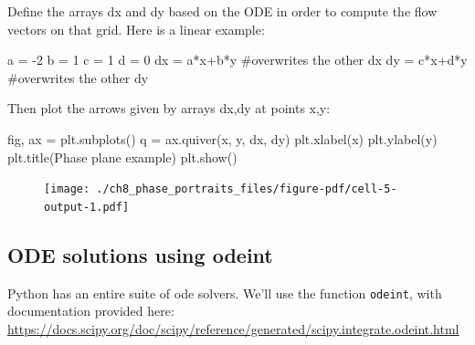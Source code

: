 \documentclass[
  letterpaper,
  DIV=11,
  numbers=noendperiod]{scrreprt}
\newenvironment{Shaded}{\begin{snugshade}}{\end{snugshade}}
\newcommand{\CommentTok}[1]{\textcolor[rgb]{0.37,0.37,0.37}{#1}}
\newcommand{\DecValTok}[1]{\textcolor[rgb]{0.68,0.00,0.00}{#1}}
\newcommand{\NormalTok}[1]{\textcolor[rgb]{0.00,0.23,0.31}{#1}}
\newcommand{\OperatorTok}[1]{\textcolor[rgb]{0.37,0.37,0.37}{#1}}
\newcommand{\StringTok}[1]{\textcolor[rgb]{0.13,0.47,0.30}{#1}}
\begin{document}
Define the arrays dx and dy based on the ODE in order to compute the
flow vectors on that grid. Here is a linear example:

\begin{Shaded}
\begin{Highlighting}[]
\NormalTok{a }\OperatorTok{=} \OperatorTok{{-}}\DecValTok{2}
\NormalTok{b }\OperatorTok{=} \DecValTok{1}
\NormalTok{c }\OperatorTok{=} \DecValTok{1}
\NormalTok{d }\OperatorTok{=} \DecValTok{0}
\NormalTok{dx }\OperatorTok{=}\NormalTok{ a}\OperatorTok{*}\NormalTok{x}\OperatorTok{+}\NormalTok{b}\OperatorTok{*}\NormalTok{y }\CommentTok{\#overwrites the other dx}
\NormalTok{dy }\OperatorTok{=}\NormalTok{ c}\OperatorTok{*}\NormalTok{x}\OperatorTok{+}\NormalTok{d}\OperatorTok{*}\NormalTok{y }\CommentTok{\#overwrites the other dy}
\end{Highlighting}
\end{Shaded}

Then plot the arrows given by arrays dx,dy at points x,y:

\begin{Shaded}
\begin{Highlighting}[]
\NormalTok{fig, ax }\OperatorTok{=}\NormalTok{ plt.subplots()}
\NormalTok{q }\OperatorTok{=}\NormalTok{ ax.quiver(x, y, dx, dy)}
\NormalTok{plt.xlabel(}\StringTok{\textquotesingle{}x\textquotesingle{}}\NormalTok{)}
\NormalTok{plt.ylabel(}\StringTok{\textquotesingle{}y\textquotesingle{}}\NormalTok{)}
\NormalTok{plt.title(}\StringTok{\textquotesingle{}Phase plane example\textquotesingle{}}\NormalTok{)}
\NormalTok{plt.show()}
\end{Highlighting}
\end{Shaded}

\begin{figure}[H]

{\centering \texttt{[image: ./ch8\_phase\_portraits\_files/figure-pdf/cell-5-output-1.pdf]}

}

\end{figure}

\hypertarget{ode-solutions-using-odeint}{%
\subsection{ODE solutions using
odeint}\label{ode-solutions-using-odeint}}

Python has an entire suite of ode solvers. We'll use the function
\texttt{odeint}, with documentation provided here:
\url{https://docs.scipy.org/doc/scipy/reference/generated/scipy.integrate.odeint.html}
\end{document}
